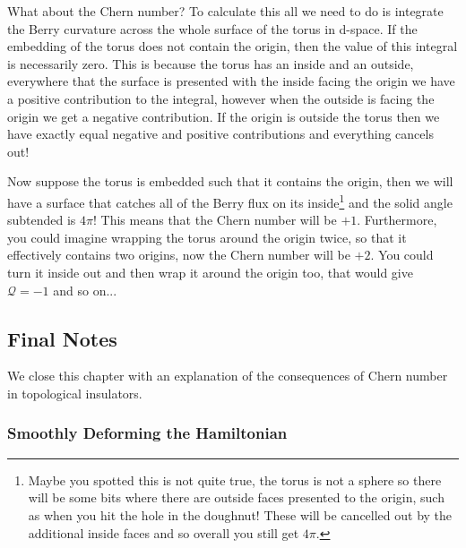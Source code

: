 What about the Chern number? To calculate this all we need to do is integrate the Berry curvature across the whole surface of the torus in d-space. If the embedding of the torus does not contain the origin, then the value of this integral is necessarily zero. This is because the torus has an inside and an outside, everywhere that the surface is presented with the inside facing the origin we have a positive contribution to the integral, however when the outside is facing the origin we get a negative contribution. If the origin is outside the torus then we have exactly equal negative and positive contributions and everything cancels out!\par
Now suppose the torus is embedded such that it contains the origin, then we will have a surface that catches all of the Berry flux on its inside\footnote{Maybe you spotted this is not quite true, the torus is not a sphere so there will be some bits where there are outside faces presented to the origin, such as when you hit the hole in the doughnut! These will be cancelled out by the additional inside faces and so overall you still get $4\pi$.} and the solid angle subtended is $4\pi$! This means that the Chern number will be $+1$. Furthermore, you could imagine wrapping the torus around the origin twice, so that it effectively contains two origins, now the Chern number will be $+2$. You could turn it inside out and then wrap it around the origin too, that would give $\mathcal Q=-1$ and so on...

\subsection{Final Notes}

We close this chapter with an explanation of the consequences of Chern number in topological insulators.

\subsubsection{Smoothly Deforming the Hamiltonian}

